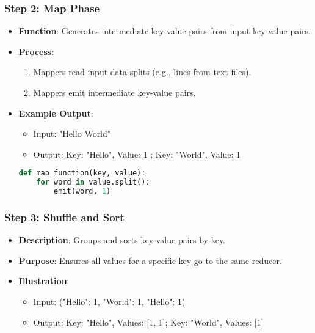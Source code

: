\documentclass[aspectratio=169]{beamer}
\begin{document}
\begin{frame}[fragile]
  \frametitle{Step 2: Map Phase}
  \begin{itemize}
    \item \textbf{Function}: Generates intermediate key-value pairs from input key-value pairs.
    \item \textbf{Process}:
    \begin{enumerate}
      \item Mappers read input data splits (e.g., lines from text files).
      \item Mappers emit intermediate key-value pairs.
    \end{enumerate}
    \item \textbf{Example Output}:
    \begin{itemize}
      \item Input: "Hello World"
      \item Output: Key: "Hello", Value: 1 ; Key: "World", Value: 1
    \end{itemize}
    \begin{lstlisting}[language=Python]
def map_function(key, value):
    for word in value.split():
        emit(word, 1)
    \end{lstlisting}
  \end{itemize}
\end{frame}

\begin{frame}[fragile]
  \frametitle{Step 3: Shuffle and Sort}
  \begin{itemize}
    \item \textbf{Description}: Groups and sorts key-value pairs by key.
    \item \textbf{Purpose}: Ensures all values for a specific key go to the same reducer.
    \item \textbf{Illustration}:
    \begin{itemize}
      \item Input: ("Hello": 1, "World": 1, "Hello": 1)
      \item Output: Key: "Hello", Values: [1, 1]; Key: "World", Values: [1]
    \end{itemize}
  \end{itemize}
\end{frame}
\end{document}
